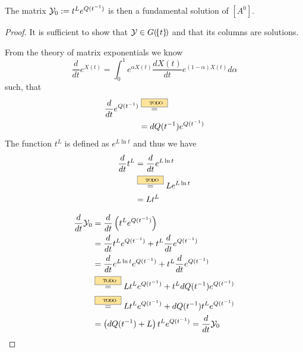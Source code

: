\begin{lem}
  The matrix $\mathcal{Y}_0:=t^Le^{Q(t^{-1})}$ is then a fundamental solution of
  $[A^0]$.
\end{lem}
\begin{proof}
  It is sufficient to show that $\mathcal{Y}\in G(\!\{t\}\!)$ and that its columns are
  solutions.

  From the theory of matrix exponentials \TODO[quelle?] we know
  \[
    \frac{d}{dt}e^{X(t)}=
    \int_0^1e^{\alpha X(t)}\frac{dX(t)}{dt}e^{(1-\alpha)X(t)}d\alpha
  \]
  such, that 
  \begin{align*}
    \frac{d}{dt}e^{Q(t^{-1})}
    &\overset{\TODO{}}{=}
  \\&=dQ(t^{-1})e^{Q(t^{-1})}
  \end{align*}
  The function $t^L$ is defined as $e^{L\ln t}$ and thus we have
  \begin{align*}
    \frac{d}{dt}t^L&=\frac{d}{dt}e^{L\ln t}
  \\&\overset{\TODO{}}{=}Le^{L\ln t}
  \\&=Lt^L
  \end{align*}

  \begin{align*}
    \frac{d}{dt}\cY_0
    &=\frac{d}{dt}\left(t^Le^{Q(t^{-1})}\right)
  \\&=\frac{d}{dt}t^Le^{Q(t^{-1})}+t^L\frac{d}{dt}e^{Q(t^{-1})}
  \\&=\frac{d}{dt}e^{L\ln t}e^{Q(t^{-1})}+t^L\frac{d}{dt}e^{Q(t^{-1})}
  \\&\overset{\TODO{}}{=}Lt^Le^{Q(t^{-1})}+t^LdQ(t^{-1})e^{Q(t^{-1})}
  \\&\overset{\TODO{}}{=}Lt^Le^{Q(t^{-1})}+dQ(t^{-1})t^Le^{Q(t^{-1})}
  \\&=\left(dQ(t^{-1})+L\right)t^Le^{Q(t^{-1})}=\frac{d}{dt}\cY_0
  \end{align*}
  \TODO{}
\end{proof}






